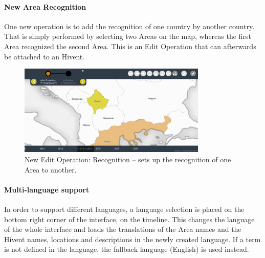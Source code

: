 

\paragraph{New Area Recognition} %
\label{par:new_area_recognition}

One new operation is to add the recognition of one country by another country. That is simply performed by selecting two Areas on the map, whereas the first Area recognized the second Area. This is an Edit Operation that can afterwards be attached to an Hivent.

\begin{figure}[ht]
  \centering
  \includegraphics[width = 0.8\textwidth]{graphics/extensions/operation_REC}
  \caption{New Edit Operation: Recognition -- sets up the recognition of one Area to another.}
  \label{fig:uncertainty_operation_REC}
\end{figure}



\paragraph{Multi-language support} %
\label{par:multi_language_support}

In order to support different languages, a language selection is placed on the bottom right corner of the interface, on the timeline. This changes the language of the whole interface and loads the translations of the Area names and the Hivent names, locations and descriptions in the newly created language. If a term is not defined in the language, the fallback language (English) is used instead.



